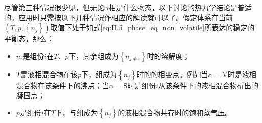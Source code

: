 \documentclass[main.tex]{subfiles}
\begin{document}
尽管第三种情况很少见，但无论$\alpha$相是什么物态，以下讨论的热力学结论是普适的。应用时只需按以下几种情况作相应的解读就可以了。假定体系在当前$\left(T,p,\left\{n_j\right\}\right)$取值下处于如式\eqref{eq:II.5_phase_eq_non_volatile}所表达的稳定的平衡态，那么：
\begin{itemize}
  \item $n_i$是组份$i$在$T$、$p$下，其余组成为$\left\{n_{j\neq i}\right\}$时的溶解度；
  \item $T$是液相混合物在该$p$下，组成为$\left\{n_j\right\}$时的的相变点。例如当$\alpha=\text{V}$时是液相混合物在该条件下的沸点；当$\alpha=\text{S}$时是组份$i$从该条件下的液相混合物析出的凝固点；
  \item $p$是组份$i$在$T$下，与组成为$\left\{n_j\right\}$的液相混合物共存时的饱和蒸气压。
\end{itemize}
\end{document}
